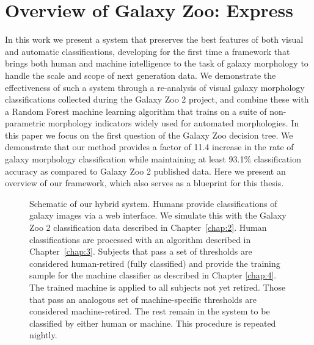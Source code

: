 \section{Overview of Galaxy Zoo: Express}

 In this work we present a system that preserves the best features of both visual and automatic classifications, developing for the first time a framework that brings both human and machine intelligence to the task of galaxy morphology to handle the scale and scope of next generation data. We demonstrate the effectiveness of such a system through a re-analysis of visual galaxy morphology classifications collected during the Galaxy Zoo 2 project, and combine these with a Random Forest machine learning algorithm that trains on a suite of non-parametric morphology indicators widely used for automated morphologies. In this paper we focus on the first question of the Galaxy Zoo decision tree. We demonstrate that our method provides a factor of 11.4 increase in the rate of galaxy morphology classification  while maintaining at least 93.1\% classification accuracy as compared to Galaxy Zoo 2 published data. Here we present an overview of our framework, which also serves as a blueprint for this thesis. 


\begin{figure}[ht!]
\caption[Schematic of the Galaxy Zoo: Express human+machine hybrid system.]{Schematic of our hybrid system. Humans provide classifications of galaxy images via a web interface. We simulate this with the Galaxy Zoo 2 classification data described in Chapter~\ref{chap:2}. Human classifications are processed with an algorithm described in Chapter~\ref{chap:3}. Subjects that pass a set of thresholds are considered human-retired (fully classified) and provide the training sample for the machine classifier as described in Chapter \ref{chap:4}. The trained machine is applied to all subjects not yet retired. Those that pass an analogous set of machine-specific thresholds are considered machine-retired. The rest remain in the system to be classified by either human or machine. This procedure is repeated  nightly. \label{fig: schematic}}
\end{figure}



